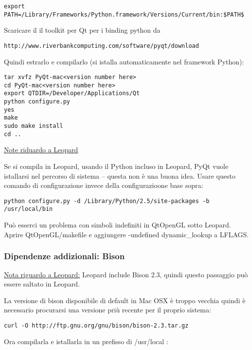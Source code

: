 \begin{verbatim}
export PATH=/Library/Frameworks/Python.framework/Versions/Current/bin:$PATH$
\end{verbatim}

Scaricare il il toolkit per Qt per i binding python da

\begin{verbatim}
http://www.riverbankcomputing.com/software/pyqt/download
\end{verbatim}

Quindi estrarlo e compilarlo (si istalla automaticamente nel framework Python):

\begin{verbatim}
tar xvfz PyQt-mac<version number here>
cd PyQt-mac<version number here>
export QTDIR=/Developer/Applications/Qt
python configure.py 
yes 
make 
sudo make install 
cd ..  
\end{verbatim}

\underline{Note riduardo a Leopard}

Se si compila in Leopard, usando il Python incluso in Leopard, PyQt vuole istallarsi nel percorso di sistema -- questa non è una buona idea.  Usare questo comando di configurazione invece della configurazioone base sopra:

\begin{verbatim}
python configure.py -d /Library/Python/2.5/site-packages -b /usr/local/bin
\end{verbatim}

Può esserci un problema con simboli indefiniti in QtOpenGL sotto Leopard.  Aprire QtOpenGL/makefile e aggiungere -undefined dynamic\_lookup a LFLAGS.

\subsubsection{Dipendenze addizionali: Bison}
\underline{Nota riguardo a Leopard:} Leopard include Bison 2.3, quindi questo passaggio può essere saltato in Leopard.

La versione di bison disponibile di default in Mac OSX è troppo vecchia quindi è necessario procurarsi una versione priù recente per il proprio sistema:

\begin{verbatim}
curl -O http://ftp.gnu.org/gnu/bison/bison-2.3.tar.gz 
\end{verbatim}

Ora compilarla e istallarla in un prefisso di /usr/local :

